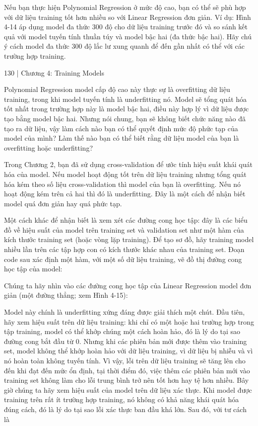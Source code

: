 Nếu bạn thực hiện Polynomial Regression ở mức độ cao, bạn có thể sẽ phù hợp với dữ liệu training tốt hơn nhiều so với Linear Regression đơn giản. Ví dụ: Hình 4-14 áp dụng model đa thức 300 độ cho dữ liệu training trước đó và so sánh kết quả với model tuyến tính thuần túy và model bậc hai (đa thức bậc hai). Hãy chú ý cách model đa thức 300 độ lắc lư xung quanh để đến gần nhất có thể với các trường hợp training.

130 | Chương 4: Training Models

Polynomial Regression model cấp độ cao này thực sự là overfitting dữ liệu training, trong khi model tuyến tính là underfitting nó. Model sẽ tổng quát hóa tốt nhất trong trường hợp này là model bậc hai, điều này hợp lý vì dữ liệu được tạo bằng model bậc hai. Nhưng nói chung, bạn sẽ không biết chức năng nào đã tạo ra dữ liệu, vậy làm cách nào bạn có thể quyết định mức độ phức tạp của model của mình? Làm thế nào bạn có thể biết rằng dữ liệu model của bạn là overfitting hoặc underfitting?

Trong Chương 2, bạn đã sử dụng cross-validation để ước tính hiệu suất khái quát hóa của model. Nếu model hoạt động tốt trên dữ liệu training nhưng tổng quát hóa kém theo số liệu cross-validation thì model của bạn là overfitting. Nếu nó hoạt động kém trên cả hai thì đó là underfitting. Đây là một cách để nhận biết model quá đơn giản hay quá phức tạp.

Một cách khác để nhận biết là xem xét các đường cong học tập: đây là các biểu đồ về hiệu suất của model trên training set và validation set như một hàm của kích thước training set (hoặc vòng lặp training). Để tạo sơ đồ, hãy training model nhiều lần trên các tập hợp con có kích thước khác nhau của training set. Đoạn code sau xác định một hàm, với một số dữ liệu training, vẽ đồ thị đường cong học tập của model:

Chúng ta hãy nhìn vào các đường cong học tập của Linear Regression model đơn giản (một đường thẳng; xem Hình 4-15):

Model này chính là underfitting xứng đáng được giải thích một chút. Đầu tiên, hãy xem hiệu suất trên dữ liệu training: khi chỉ có một hoặc hai trường hợp trong tập training, model có thể khớp chúng một cách hoàn hảo, đó là lý do tại sao đường cong bắt đầu từ 0. Nhưng khi các phiên bản mới được thêm vào training set, model không thể khớp hoàn hảo với dữ liệu training, vì dữ liệu bị nhiễu và vì nó hoàn toàn không tuyến tính. Vì vậy, lỗi trên dữ liệu training sẽ tăng lên cho đến khi đạt đến mức ổn định, tại thời điểm đó, việc thêm các phiên bản mới vào training set không làm cho lỗi trung bình trở nên tốt hơn hay tệ hơn nhiều. Bây giờ chúng ta hãy xem hiệu suất của model trên dữ liệu xác thực. Khi model được training trên rất ít trường hợp training, nó không có khả năng khái quát hóa đúng cách, đó là lý do tại sao lỗi xác thực ban đầu khá lớn. Sau đó, với tư cách là

